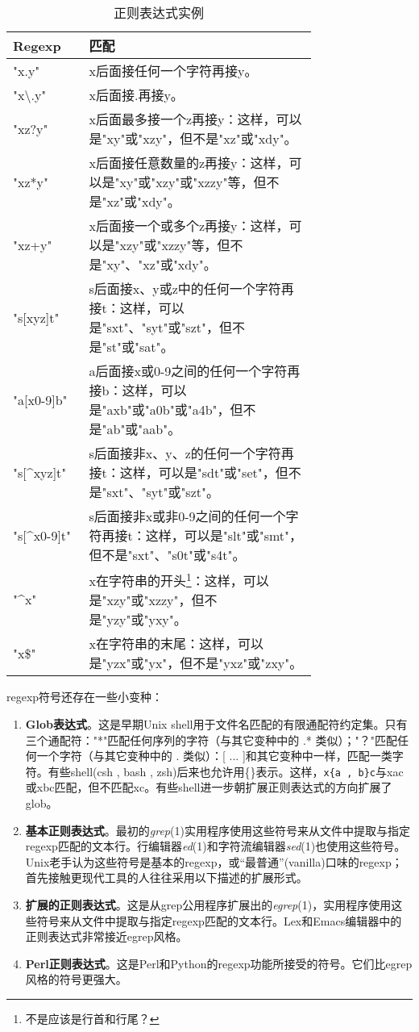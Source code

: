 \documentclass[12pt,oneside]{book}
\begin{document}
\begin{common-format}
\noindent
\begin{minipage}{\linewidth}
\begin{table}[H]
\centering
\caption{正则表达式实例}
\medskip 
\begin{tabular}{@{}lp{0.75\linewidth}@{}}
\toprule
Regexp & 匹配  \\ \midrule
"x.y" & x后面接任何一个字符再接y。 \\
"x\textbackslash{}.y" &	x后面接.再接y。 \\
"xz?y" & x后面最多接一个z再接y：这样，可以是"xy"或"xzy"，但不是"xz"或"xdy"。 \\
"xz*y" & x后面接任意数量的z再接y：这样，可以是"xy"或"xzy"或"xzzy"等，但不是"xz"或"xdy"。 \\
"xz+y" & x后面接一个或多个z再接y：这样，可以是"xzy"或"xzzy"等，但不是"xy"、"xz"或"xdy"。 \\
"s[xyz]t" &  s后面接x、y或z中的任何一个字符再接t：这样，可以是"sxt"、"syt"或"szt"，但不是"st"或"sat"。 \\
"a[x0-9]b" & 	a后面接x或0-9之间的任何一个字符再接b：这样，可以是"axb"或"a0b"或"a4b"，但不是"ab"或"aab"。 \\
"s[\^{}xyz]t" & s后面接非x、y、z的任何一个字符再接t：这样，可以是"sdt"或"set"，但不是"sxt"、"syt"或"szt"。\\
"s[\^{}x0-9]t" & s后面接非x或非0-9之间的任何一个字符再接t：这样，可以是"slt"或"smt"，但不是"sxt"、"s0t"或"s4t"。\\
"\^{}x"	& x在字符串的开头\footnote{不是应该是行首和行尾？}：这样，可以是"xzy"或"xzzy"，但不是"yzy"或"yxy"。\\
"x\${}" & x在字符串的末尾：这样，可以是"yzx"或"yx"，但不是"yxz"或"zxy"。  
\\ \bottomrule
\end{tabular}
\end{table}
\end{minipage}

regexp符号还存在一些小变种：
\begin{enumerate}
\item \textbf{Glob表达式}。这是早期Unix shell用于文件名匹配的有限通配符约定集。只有三个通配符："*"匹配任何序列的字符（与其它变种中的 .* 类似）；"？"匹配任何一个字符（与其它变种中的 . 类似）：[ ... ]和其它变种中一样，匹配一类字符。有些shell(csh , bash , zsh)后来也允许用\{\}表示。这样，\verb+x{a , b}c+与xac或xbc匹配，但不匹配xc。有些shell进一步朝扩展正则表达式的方向扩展了glob。
\item \textbf{基本正则表达式}。最初的\textit{grep}(1)实用程序使用这些符号来从文件中提取与指定regexp匹配的文本行。行编辑器\textit{ed}(1)和字符流编辑器\textit{sed}(1)也使用这些符号。Unix老手认为这些符号是基本的regexp，或“最普通”(vanilla)口味的regexp；首先接触更现代工具的人往往采用以下描述的扩展形式。
\item \textbf{扩展的正则表达式}。这是从grep公用程序扩展出的\textit{egrep}(1)，实用程序使用这些符号来从文件中提取与指定regexp匹配的文本行。Lex和Emacs编辑器中的正则表达式非常接近egrep风格。
\item \textbf{Perl正则表达式}。这是Perl和Python的regexp功能所接受的符号。它们比egrep风格的符号更强大。
\end{enumerate}


\end{common-format}
\end{document}
